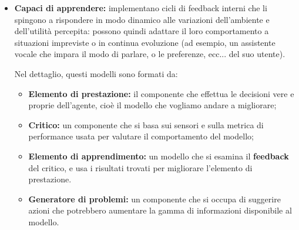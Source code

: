 \documentclass[a4paper,11pt]{article}
\begin{document}
\begin{itemize}
\begin{itemize}
\begin{center}
\begin{tikzpicture}[x=0.75pt,y=0.75pt,yscale=-1,xscale=1, font =\sffamily]
\end{tikzpicture}
\end{center}

		\end{itemize}
	\item \textbf{Capaci di apprendere:} implementano cicli di feedback interni che li spingono a rispondere in modo dinamico alle variazioni dell'ambiente e dell'utilità percepita: possono quindi adattare il loro comportamento a situazioni impreviste o in continua evoluzione (ad esempio, un assistente vocale che impara il modo di parlare, o le preferenze, ecc... del suo utente).

	Nel dettaglio, questi modelli sono formati da:
	\begin{itemize}
		\item \textbf{Elemento di prestazione:} il componente che effettua le decisioni vere e proprie dell'agente, cioè il modello che vogliamo andare a migliorare;
		\item \textbf{Critico:} un componente che si basa sui sensori e sulla metrica di performance usata per valutare il comportamento del modello;
		\item \textbf{Elemento di apprendimento:} un modello che si esamina il \textbf{feedback} del critico, e usa i risultati trovati per migliorare l'elemento di prestazione.
		\item \textbf{Generatore di problemi:} un componente che si occupa di suggerire azioni che potrebbero aumentare la gamma di informazioni disponibile al modello.
	\end{itemize}

\begin{center}
  

\begin{tikzpicture}[x=0.75pt,y=0.75pt,yscale=-1,xscale=1, font =\sffamily]


\end{tikzpicture}
\end{center}
\end{itemize}
\end{document}
